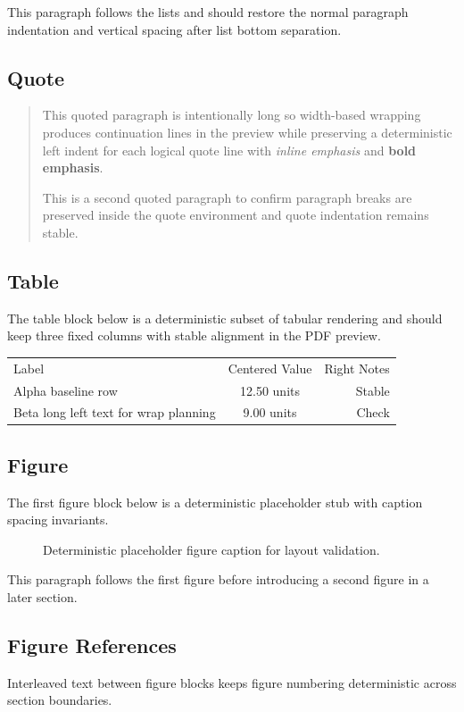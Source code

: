 \documentclass{article}
\begin{document}
This paragraph follows the lists and should restore the normal paragraph indentation and vertical spacing after list bottom separation.

\subsection{Quote}
\begin{quote}
This quoted paragraph is intentionally long so width-based wrapping produces continuation lines in the preview while preserving a deterministic left indent for each logical quote line with \emph{inline emphasis} and \textbf{bold emphasis}.

This is a second quoted paragraph to confirm paragraph breaks are preserved inside the quote environment and quote indentation remains stable.
\end{quote}

\subsection{Table}
The table block below is a deterministic subset of tabular rendering and should keep three fixed columns with stable alignment in the PDF preview.

\begin{tabular}{lcr}
Label & Centered Value & Right Notes\\
Alpha baseline row & 12.50 units & Stable\\
Beta long left text for wrap planning & 9.00 units & Check\\
\end{tabular}

\subsection{Figure}
The first figure block below is a deterministic placeholder stub with caption spacing invariants.

\begin{figure}
\caption{Deterministic placeholder figure caption for layout validation.}
\end{figure}
This paragraph follows the first figure before introducing a second figure in a later section.

\subsection{Figure References}
Interleaved text between figure blocks keeps figure numbering deterministic across section boundaries.
\end{document}
